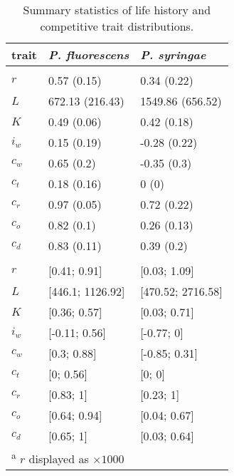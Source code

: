 \begin{table}[!ht]

\caption{\label{tab:}Summary statistics of life history and competitive trait distributions.}
\centering
\fontsize{10}{10}\selectfont
\begin{tabular}[t]{lll}
\toprule
trait & \textit{P. fluorescens} & \textit{P. syringae}\\
\midrule
\addlinespace[0.3em]
\multicolumn{3}{l}{\textbf{$\mu (\sigma)$}}\\
\hspace{1em}$r$ & 0.57 (0.15) & 0.34 (0.22)\\
\hspace{1em}$L$ & 672.13 (216.43) & 1549.86 (656.52)\\
\hspace{1em}$K$ & 0.49 (0.06) & 0.42 (0.18)\\
\hspace{1em}$i_w$ & 0.15 (0.19) & -0.28 (0.22)\\
\hspace{1em}$c_w$ & 0.65 (0.2) & -0.35 (0.3)\\
\hspace{1em}$c_t$ & 0.18 (0.16) & 0 (0)\\
\hspace{1em}$c_r$ & 0.97 (0.05) & 0.72 (0.22)\\
\hspace{1em}$c_o$ & 0.82 (0.1) & 0.26 (0.13)\\
\hspace{1em}$c_d$ & 0.83 (0.11) & 0.39 (0.2)\\
\addlinespace[0.3em]
\multicolumn{3}{l}{\textbf{\texttt{[min; max]}}}\\
\hspace{1em}$r$ & [0.41; 0.91] & [0.03; 1.09]\\
\hspace{1em}$L$ & [446.1; 1126.92] & [470.52; 2716.58]\\
\hspace{1em}$K$ & [0.36; 0.57] & [0.03; 0.71]\\
\hspace{1em}$i_w$ & [-0.11; 0.56] & [-0.77; 0]\\
\hspace{1em}$c_w$ & [0.3; 0.88] & [-0.85; 0.31]\\
\hspace{1em}$c_t$ & [0; 0.56] & [0; 0]\\
\hspace{1em}$c_r$ & [0.83; 1] & [0.23; 1]\\
\hspace{1em}$c_o$ & [0.64; 0.94] & [0.04; 0.67]\\
\hspace{1em}$c_d$ & [0.65; 1] & [0.03; 0.64]\\
\bottomrule
\multicolumn{3}{l}{\textsuperscript{a} $r$ displayed as $\times 1000$}\\
\end{tabular}
\end{table}
